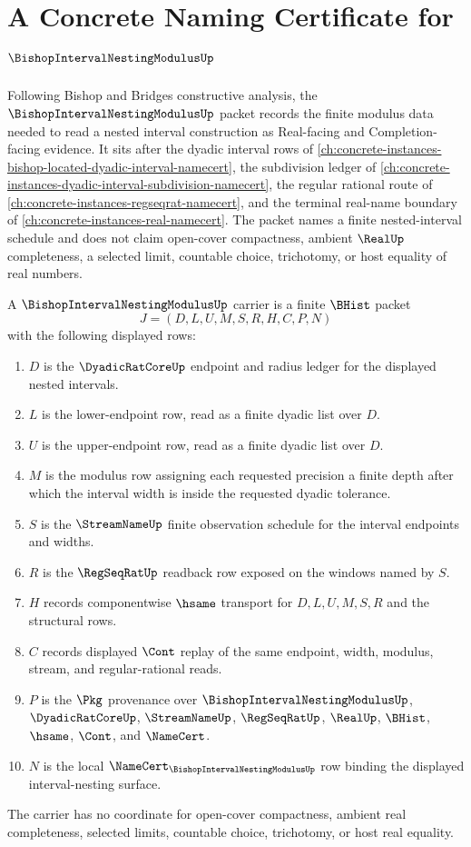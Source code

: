\chapter{A Concrete Naming Certificate for $\BishopIntervalNestingModulusUp$}
\label{ch:concrete-instances-bishop-interval-nesting-modulus-namecert}

Following Bishop and Bridges constructive analysis, the $\BishopIntervalNestingModulusUp$ packet records the finite modulus data needed to read a nested interval construction as Real-facing and Completion-facing evidence. It sits after the dyadic interval rows of \autoref{ch:concrete-instances-bishop-located-dyadic-interval-namecert}, the subdivision ledger of \autoref{ch:concrete-instances-dyadic-interval-subdivision-namecert}, the regular rational route of \autoref{ch:concrete-instances-regseqrat-namecert}, and the terminal real-name boundary of \autoref{ch:concrete-instances-real-namecert}. The packet names a finite nested-interval schedule and does not claim open-cover compactness, ambient $\RealUp$ completeness, a selected limit, countable choice, trichotomy, or host equality of real numbers.

\begin{definition}
\label{def:bishop-interval-nesting-modulus-carrier}
A $\BishopIntervalNestingModulusUp$ carrier is a finite $\BHist$ packet
$$
J=(D,L,U,M,S,R,H,C,P,N)
$$
with the following displayed rows:
\begin{enumerate}
\item $D$ is the $\DyadicRatCoreUp$ endpoint and radius ledger for the displayed nested intervals.
\item $L$ is the lower-endpoint row, read as a finite dyadic list over $D$.
\item $U$ is the upper-endpoint row, read as a finite dyadic list over $D$.
\item $M$ is the modulus row assigning each requested precision a finite depth after which the interval width is inside the requested dyadic tolerance.
\item $S$ is the $\StreamNameUp$ finite observation schedule for the interval endpoints and widths.
\item $R$ is the $\RegSeqRatUp$ readback row exposed on the windows named by $S$.
\item $H$ records componentwise $\hsame$ transport for $D,L,U,M,S,R$ and the structural rows.
\item $C$ records displayed $\Cont$ replay of the same endpoint, width, modulus, stream, and regular-rational reads.
\item $P$ is the $\Pkg$ provenance over $\BishopIntervalNestingModulusUp$, $\DyadicRatCoreUp$, $\StreamNameUp$, $\RegSeqRatUp$, $\RealUp$, $\BHist$, $\hsame$, $\Cont$, and $\NameCert$.
\item $N$ is the local $\NameCert_{\BishopIntervalNestingModulusUp}$ row binding the displayed interval-nesting surface.
\end{enumerate}
The carrier has no coordinate for open-cover compactness, ambient real completeness, selected limits, countable choice, trichotomy, or host real equality.
\end{definition}

